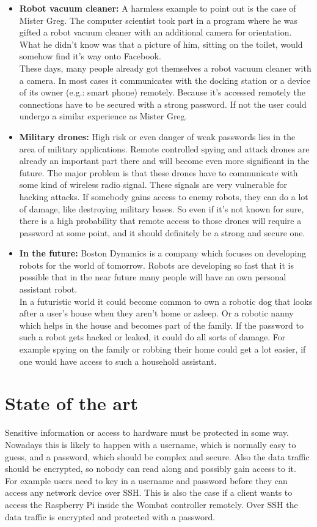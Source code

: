 \documentclass[conference]{IEEEtran}
\begin{document}
\begin{itemize}
\item \textbf{Robot vacuum cleaner:} A harmless example to point out is the case of Mister Greg. The computer scientist took part in a program where he was gifted a robot vacuum cleaner with an additional camera for orientation. What he didn't know was that a picture of him, sitting on the toilet, would somehow find it's way onto Facebook. \cite{b10}\\
These days, many people already got themselves a robot vacuum cleaner with a camera. In most cases it communicates with the docking station or a device of its owner (e.g.: smart phone) remotely. Because it's accessed remotely the connections have to be secured with a strong password. If not the user could undergo a similar experience as Mister Greg. 
\item \textbf{Military drones:} High risk or even danger of weak passwords lies in the area of military applications. Remote controlled spying and attack drones are already an important part there and will become even more significant in the future. The major problem is that these drones have to communicate with some kind of wireless radio signal. These signals are very vulnerable for hacking attacks. If somebody gains access to enemy robots, they can do a lot of damage, like destroying military bases. So even if it's not known for sure, there is a high probability that remote access to those drones will require a password at some point, and it should definitely be a strong and secure one.
\item \textbf{In the future:} Boston Dynamics is a company which focuses on developing robots for the world of tomorrow. Robots are developing so fast that it is possible that in the near future many people will have an own personal assistant robot. \cite{b12}\\
In a futuristic world it could become common to own a robotic dog that looks after a user's house when they aren't home or asleep. Or a robotic nanny which helps in the house and becomes part of the family. If the password to such a robot gets hacked or leaked, it could do all sorts of damage. For example spying on the family or robbing their home could get a lot easier, if one would have access to such a household assistant.
\end{itemize}

\section{State of the art}
Sensitive information or access to hardware must be protected in some way. Nowadays this is likely to happen with a username, which is normally easy to guess, and a password, which should be complex and secure. Also the data traffic should be encrypted, so nobody can read along and possibly gain access to it.\\
For example users need to key in a username and password before they can access any network device over SSH. This is also the case if a client wants to access the Raspberry Pi inside the Wombat controller remotely. Over SSH the data traffic is encrypted and protected with a password.
\end{document}
